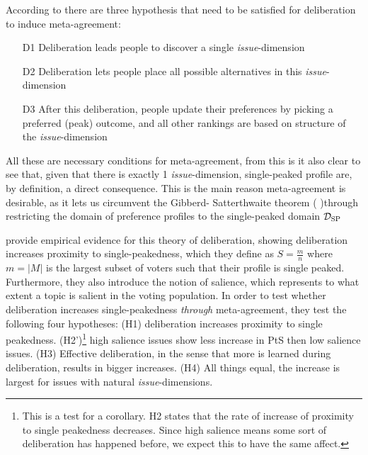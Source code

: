 According to \citet{listTwoConceptsAgreement2002} there are three hypothesis that need to be satisfied for deliberation to induce meta-agreement:
\begin{enumerate}
	\label{list:meta-agreement-checklist}
	\setlength\itemsep{1px}
	\item [D1] Deliberation leads people to discover a single \textit{issue}-dimension
	\item [D2] Deliberation lets people place all possible alternatives in this \textit{issue}-dimension
	\item [D3] After this deliberation, people update their preferences by picking a preferred (peak) outcome, and all other rankings are based on structure of the \textit{issue}-dimension
\end{enumerate}

All these are necessary conditions for meta-agreement, from this is it also clear to see that, given that there is exactly 1 \textit{issue}-dimension, single-peaked profile are, by definition, a direct consequence. This is the main reason meta-agreement is desirable, as it lets us circumvent the Gibberd- Satterthwaite theorem (\citep{gibbardManipulationVotingSchemes1973} \citep{satterthwaiteStrategyproofnessArrowsConditions1975})through restricting the domain of preference profiles to the single-peaked domain $\mathcal{D}_{\textnormal{SP}}$


\citet{listDeliberationSinglePeakednessPossibility2013} provide empirical evidence for this theory of deliberation, showing deliberation increases proximity to single-peakedness, which they define as $S= \frac{m}{n}$ where $m = |M|$ is the largest subset of voters such that their profile is single peaked. Furthermore, they also introduce the notion of salience, which represents to what extent a topic is salient in the voting population. In order to test whether deliberation increases single-peakedness \textit{through} meta-agreement, they test the following four hypotheses: (H1) deliberation increases proximity to single peakedness. (H2')\footnote{This is a test for a corollary. H2 states that the rate of increase of proximity to single peakedness decreases. Since high salience means some sort of deliberation has happened before, we expect this to have the same affect.} high salience issues show less increase in PtS then low salience issues. (H3) Effective deliberation, in the sense that more is learned during deliberation, results in bigger increases. (H4) All things equal, the increase is largest for issues with natural \textit{issue}-dimensions.

